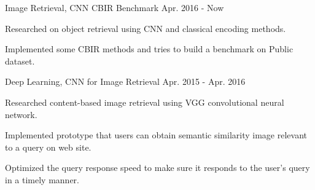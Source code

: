 

\begin{cventries}

  \cventry
    {Image Retrieval, \href{https://github.com/willard-yuan/cnn-cbir-benchmark}{\color{blue}{Code}}} %
    {CNN CBIR Benchmark} %
    {} %
    {Apr. 2016 - Now} %
    {
      \begin{cvitems} %
        \item {Researched on object retrieval using CNN and classical encoding methods.}
        \item {Implemented some CBIR methods and tries to build a benchmark on Public dataset.}
      \end{cvitems}
    }

  \cventry
    {Deep Learning, \href{https://github.com/willard-yuan/CNN-for-Image-Retrieval}{\color{blue}{Code}}} %
    {CNN for Image Retrieval} %
    {} %
    {Apr. 2015 - Apr. 2016} %
    {
      \begin{cvitems} %
        \item {Researched content-based image retrieval using VGG convolutional neural network.}
        \item {Implemented prototype that users can obtain semantic similarity image relevant to a query on web site.}
        \item {Optimized the query response speed to make sure it responds to the user’s query in a timely manner.}
      \end{cvitems}
    }


\end{cventries}

